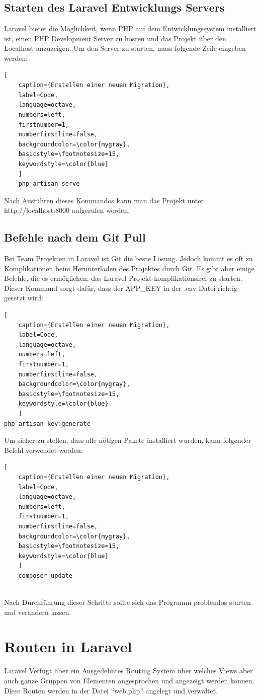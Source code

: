 \subsection{Starten des Laravel Entwicklungs Servers}
Laravel bietet die Möglichkeit, wenn PHP auf dem Entwicklungssystem installiert ist, einen PHP Development Server zu hosten und das Projekt über den Localhost anzuzeigen. Um den Server zu starten, muss folgende Zeile eingeben werden:
\begin{lstlisting}[
	caption={Erstellen einer neuen Migration},
	label=Code,
	language=octave,
	numbers=left,
	firstnumber=1,
	numberfirstline=false,
	backgroundcolor=\color{mygray},
	basicstyle=\footnotesize=15,
	keywordstyle=\color{blue}
	]
	php artisan serve
\end{lstlisting}
Nach Ausführen dieses Kommandos kann man das Projekt unter http://localhost:8000 aufgerufen werden.


\subsection{Befehle nach dem Git Pull} 
Bei Team Projekten in Laravel ist Git die beste Lösung. Jedoch kommt es oft zu Komplikationen beim Herunterladen des Projektes durch Git. Es gibt aber einige Befehle, die es ermöglichen, das Laravel Projekt komplikationsfrei zu starten.
Dieser Kommand sorgt dafür, dass der APP\_KEY in der .env Datei richtig gesetzt wird:
\begin{lstlisting}[
	caption={Erstellen einer neuen Migration},
	label=Code,
	language=octave,
	numbers=left,
	firstnumber=1,
	numberfirstline=false,
	backgroundcolor=\color{mygray},
	basicstyle=\footnotesize=15,
	keywordstyle=\color{blue}
	]
php artisan key:generate 

\end{lstlisting}
Um sicher zu stellen, dass alle nötigen Pakete installiert wurden, kann folgender Befehl verwendet werden:
\begin{lstlisting}[
	caption={Erstellen einer neuen Migration},
	label=Code,
	language=octave,
	numbers=left,
	firstnumber=1,
	numberfirstline=false,
	backgroundcolor=\color{mygray},
	basicstyle=\footnotesize=15,
	keywordstyle=\color{blue}
	]
	composer update
	
\end{lstlisting}
Nach Durchführung dieser Schritte sollte sich das Programm problemlos starten und verändern lassen.



\section{Routen in Laravel}
Laravel Verfügt über ein Ausgedehntes Routing System über welches Views aber auch ganze Gruppen von Elementen angesprochen und angezeigt werden können. Diese Routen werden in der Datei “web.php” angelegt und verwaltet.
